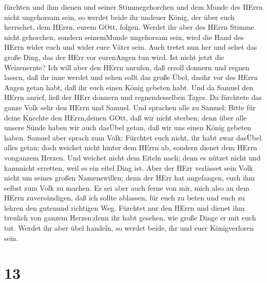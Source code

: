 fürchten und ihm dienen und seiner Stimmegehorchen und dem Munde des
HErrn nicht ungehorsam sein, so werdet beide ihr undeuer König, der über
euch herrschet, dem HErrn, eurem GOtt, folgen.  Werdet ihr
aber des HErrn Stimme nicht gehorchen, sondern seinemMunde ungehorsam
sein, wird die Hand des HErrn wider euch und wider eure Väter sein.
 Auch tretet nun her und sehet das große Ding, das der HErr
vor eurenAugen tun wird.  Ist nicht jetzt die Weizenernte?
Ich will aber den HErrn anrufen, daß ersoll donnern und regnen lassen,
daß ihr inne werdet und sehen sollt das große Übel, dasihr vor des HErrn
Augen getan habt, daß ihr euch einen König gebeten habt. 
Und da Samuel den HErrn anrief, ließ der HErr donnern und
regnendesselben Tages. Da fürchtete das ganze Volk sehr den HErrn und
Samuel.  Und sprachen alle zu Samuel: Bitte für deine
Knechte den HErrn,deinen GOtt, daß wir nicht sterben; denn über alle
unsere Sünde haben wir auch dasÜbel getan, daß wir uns einen König
gebeten haben.  Samuel aber sprach zum Volk: Fürchtet euch
nicht, ihr habt zwar dasÜbel alles getan; doch weichet nicht hinter dem
HErrn ab, sondern dienet dem HErrn vonganzem Herzen.  Und
weichet nicht dem Eiteln nach; denn es nützet nicht und kannnicht
erretten, weil es ein eitel Ding ist.  Aber der HErr
verlässet sein Volk nicht um seines großen Namenswillen; denn der HErr
hat angefangen, euch ihm selbst zum Volk zu machen.  Es sei
aber auch ferne von mir, mich also an dem HErrn zuversündigen, daß ich
sollte ablassen, für euch zu beten und euch zu lehren den gutenund
richtigen Weg.  Fürchtet nur den HErrn und dienet ihm
treulich von ganzem Herzen;denn ihr habt gesehen, wie große Dinge er mit
euch tut.  Werdet ihr aber übel handeln, so werdet beide,
ihr und euer Königverloren sein.

\hypertarget{section-12}{%
\section{13}\label{section-12}}

